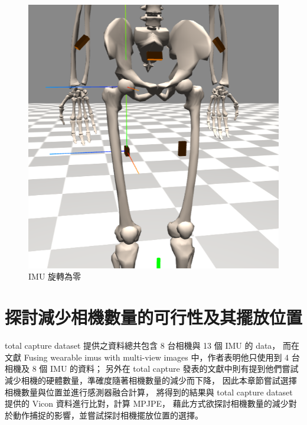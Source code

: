 \begin{figure}[!ht]
\begin{minipage}{.3\textwidth}
   \end{minipage}%
   \begin{minipage}{.3\textwidth}
      \centering
      \includegraphics[width=.8\linewidth, height=.8\linewidth]{figure/ch3_fig_imu_rot.png}
      \caption[IMU 旋轉為零]{IMU 旋轉為零}
      \label{ch3_fig_imu_rot}
    \end{minipage}
\end{figure}

\section{探討減少相機數量的可行性及其擺放位置}
total capture dataset 提供之資料總共包含 8 台相機與 13 個 IMU 的 data，
而在文獻 Fusing wearable imus with multi-view images 中，作者表明他只使用到 4 台相機及 8 個 IMU 的資料；
另外在 total capture 發表的文獻中則有提到他們嘗試減少相機的硬體數量，準確度隨著相機數量的減少而下降，
因此本章節嘗試選擇相機數量與位置並進行感測器融合計算，
將得到的結果與 total capture dataset 提供的 Vicon 資料進行比對，計算 MPJPE，
藉此方式欲探討相機數量的減少對於動作捕捉的影響，並嘗試探討相機擺放位置的選擇。

